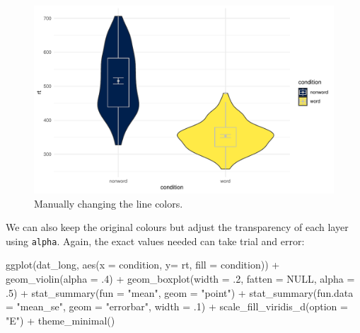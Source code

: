 \documentclass[
  english,
  doc,floatsintext]{apa6}
\newenvironment{Shaded}{\begin{snugshade}}{\end{snugshade}}
\newcommand{\AttributeTok}[1]{\textcolor[rgb]{0.77,0.63,0.00}{#1}}
\newcommand{\ConstantTok}[1]{\textcolor[rgb]{0.00,0.00,0.00}{#1}}
\newcommand{\DecValTok}[1]{\textcolor[rgb]{0.00,0.00,0.81}{#1}}
\newcommand{\FunctionTok}[1]{\textcolor[rgb]{0.00,0.00,0.00}{#1}}
\newcommand{\NormalTok}[1]{#1}
\newcommand{\SpecialCharTok}[1]{\textcolor[rgb]{0.00,0.00,0.00}{#1}}
\newcommand{\StringTok}[1]{\textcolor[rgb]{0.31,0.60,0.02}{#1}}
\begin{document}
\begin{figure}

{\centering \includegraphics[width=1\linewidth]{images/viobox5-1} 

}

\caption{Manually changing the line colors.}\label{fig:viobox5}
\end{figure}

We can also keep the original colours but adjust the transparency of each layer using \texttt{alpha}. Again, the exact values needed can take trial and error:

\begin{Shaded}
\begin{Highlighting}[]
\FunctionTok{ggplot}\NormalTok{(dat\_long, }\FunctionTok{aes}\NormalTok{(}\AttributeTok{x =}\NormalTok{ condition, }\AttributeTok{y=}\NormalTok{ rt, }\AttributeTok{fill =}\NormalTok{ condition)) }\SpecialCharTok{+}
  \FunctionTok{geom\_violin}\NormalTok{(}\AttributeTok{alpha =}\NormalTok{ .}\DecValTok{4}\NormalTok{) }\SpecialCharTok{+}
  \FunctionTok{geom\_boxplot}\NormalTok{(}\AttributeTok{width =}\NormalTok{ .}\DecValTok{2}\NormalTok{, }\AttributeTok{fatten =} \ConstantTok{NULL}\NormalTok{, }\AttributeTok{alpha =}\NormalTok{ .}\DecValTok{5}\NormalTok{) }\SpecialCharTok{+}
  \FunctionTok{stat\_summary}\NormalTok{(}\AttributeTok{fun =} \StringTok{"mean"}\NormalTok{, }\AttributeTok{geom =} \StringTok{"point"}\NormalTok{) }\SpecialCharTok{+}
  \FunctionTok{stat\_summary}\NormalTok{(}\AttributeTok{fun.data =} \StringTok{"mean\_se"}\NormalTok{, }\AttributeTok{geom =} \StringTok{"errorbar"}\NormalTok{, }\AttributeTok{width =}\NormalTok{ .}\DecValTok{1}\NormalTok{) }\SpecialCharTok{+}
  \FunctionTok{scale\_fill\_viridis\_d}\NormalTok{(}\AttributeTok{option =} \StringTok{"E"}\NormalTok{) }\SpecialCharTok{+}
  \FunctionTok{theme\_minimal}\NormalTok{()}
\end{Highlighting}
\end{Shaded}
\end{document}
